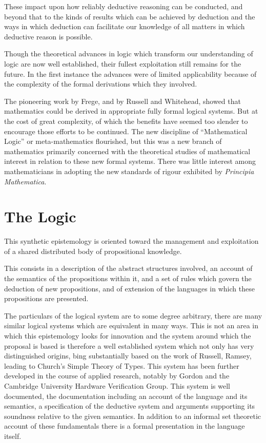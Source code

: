 \documentclass[10pt,titlepage]{book}
\begin{document}
These impact upon how reliably deductive reasoning can be conducted, and beyond that to the kinds of results which can be achieved by deduction and the ways in which deduction can facilitate our knowledge of all matters in which deductive reason is possible.

Though the theoretical advances in logic which transform our understanding of logic are now well established, their fullest exploitation still remains for the future.
In the first instance the advances were of limited applicability because of the complexity of the formal derivations which they involved.

The pioneering work by Frege, and by Russell and Whitehead, showed that mathematics could be derived in appropriate fully formal logical systems.
But at the cost of great complexity, of which the benefits have seemed too slender to encourage those efforts to be continued.
The new discipline of ``Mathematical Logic'' or meta-mathematics flourished, but this was a new branch of mathematics primarily concerned with the theoretical studies of mathematical interest in relation to these new formal systems.
There was little interest among mathematicians in adopting the new standards of rigour exhibited by \emph{Principia Mathematica}\cite{russell1910}.

\section{The Logic}

This synthetic epistemology is oriented toward the management and exploitation of a shared distributed body of propositional knowledge.

This consists in a description of the abstract structures involved, an account of the semantics of the propositions within it, and a set of rules which govern the deduction of new propositions, and of extension of the languages in which these propositions are presented.

The particulars of the logical system are to some degree arbitrary, there are many similar logical systems which are equivalent in many ways.
This is not an area in which this epistemology looks for innovation and the system around which the proposal is based is therefore a well established system which not only has very distinguished origins, bing substantially based on the work of Russell, Ramsey, leading to  Church's Simple Theory of Types.
This system has been further developed in the course of applied research, notably by Gordon and the Cambridge University Hardware Verification Group.
This system is well documented, the documentation including an account of the language and its semantics, a specification of the deductive system and arguments supporting its soundness relative to the given semantics.
In addition to an informal set theoretic account of these fundamentals there is a formal presentation in the language itself.
\end{document}
